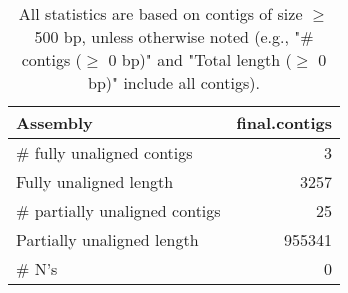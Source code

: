 \documentclass[12pt,a4paper]{article}
\begin{document}
\begin{table}[ht]
\begin{center}
\caption{All statistics are based on contigs of size $\geq$ 500 bp, unless otherwise noted (e.g., "\# contigs ($\geq$ 0 bp)" and "Total length ($\geq$ 0 bp)" include all contigs).}
\begin{tabular}{|l*{1}{|r}|}
\hline
Assembly & final.contigs \\ \hline
\# fully unaligned contigs & 3 \\ \hline
Fully unaligned length & 3257 \\ \hline
\# partially unaligned contigs & 25 \\ \hline
Partially unaligned length & 955341 \\ \hline
\# N's & 0 \\ \hline
\end{tabular}
\end{center}
\end{table}
\end{document}
